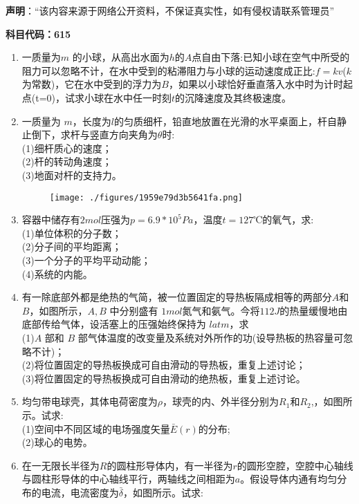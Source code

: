 

\textbf{声明}：“该内容来源于网络公开资料，不保证真实性，如有侵权请联系管理员”


\textbf{科目代码：615}

\begin{enumerate}
\item 一质量为$ m$ 的小球，从高出水面为$h$的$ A $点自由下落:已知小球在空气中所受的阻力可以忽略不计，在水中受到的粘滞阻力与小球的运动速度成正比:$f=kv$($k$为常数)，它在水中受到的浮力为$ B$，如果以小球恰好垂直落入水中时为计时起点(t=0)，试求小球在水中任一时刻$t$的沉降速度及其终极速度。
\item 一质量为 $m$，长度为$l$的匀质细杆，铅直地放置在光滑的水平桌面上，杆自静止倒下，求杆与竖直方向夹角为$\theta$时:\\
(1)细杆质心的速度；\\
(2)杆的转动角速度；\\
(3)地面对杆的支持力。
\begin{figure}[ht]
\centering
\texttt{[image: ./figures/1959e79d3b5641fa.png]}
\caption{} \label{fig_XD08_1}
\end{figure}
\item 容器中储存有$2mol $压强为$ p=6.9*10^5Pa$，温度$t=127$℃的氧气，求:\\
(1)单位体积的分子数；\\
(2)分子间的平均距离；\\
(3)一个分子的平均平动动能；\\
(4)系统的内能。
\item 有一除底部外都是绝热的气简，被一位置固定的导热板隔成相等的两部分$A$和 $B$，如图所示，$A,B$ 中分别盛有 $1mol$氮气和氨气。今将$112J$的热量缓慢地由底部传给气体，设活塞上的压强始终保持为 $latm$，求\\
(1)$A$ 部和 $B$ 部气体温度的改变量及系统对外所作的功(设导热板的热容量可忽略不计)；\\
(2)将位置固定的导热板换成可自由滑动的导热板，重复上述讨论；\\
(3)将位置固定的导热板换成可自由滑动的绝热板，重复上述讨论。
\item 均匀带电球壳，其体电荷密度为$\rho$，球壳的内、外半径分别为$R_1$和$R_2$,，如图所示。试求:\\
(1)空间中不同区域的电场强度矢量$\bar E(r)$的分布;\\
(2)球心的电势。
\item 在一无限长半径为$R$的圆柱形导体内，有一半径为$r$的圆形空腔，空腔中心轴线与圆柱形导体的中心轴线平行，两轴线之间相距为$a$。假设导体内通有均匀分布的电流，电流密度为$\bar \delta$，如图所示。试求:\\

\end{enumerate}
